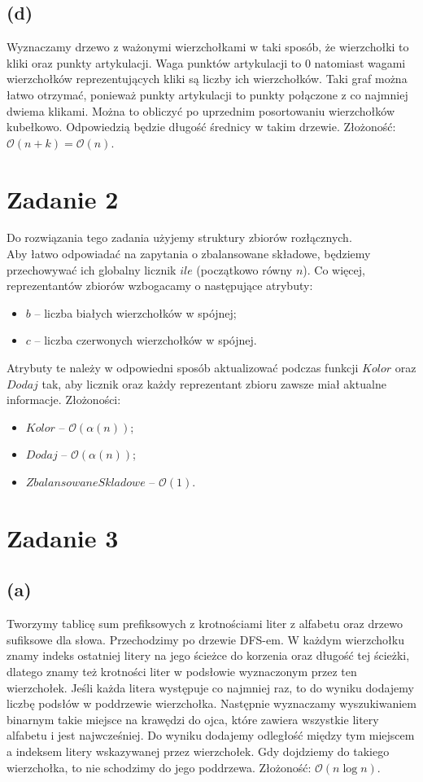 \documentclass[12pt, a4paper]{article}
\newcommand{\MCALO}{\mathcal{O}}
\begin{document}
\subsection*{(d)}
Wyznaczamy drzewo z ważonymi wierzchołkami w taki sposób, że wierzchołki to
kliki oraz punkty artykulacji. Waga punktów artykulacji to $0$ natomiast wagami
wierzchołków reprezentujących kliki są liczby ich wierzchołków. Taki graf można
łatwo otrzymać, ponieważ punkty artykulacji to punkty połączone z co najmniej
dwiema klikami. Można to obliczyć po uprzednim posortowaniu wierzchołków
kubełkowo. Odpowiedzią będzie długość średnicy w takim drzewie. 
Złożoność: $\MCALO(n+k) = \MCALO(n)$.

\newpage
\section*{Zadanie 2}
Do rozwiązania tego zadania użyjemy struktury zbiorów rozłącznych.\\
Aby łatwo odpowiadać na zapytania o zbalansowane składowe, będziemy
przechowywać ich globalny licznik $ile$ (początkowo równy $n$). Co więcej,
reprezentantów zbiorów wzbogacamy o następujące atrybuty:
\begin{itemize}
  \item $\mathit{b}$ -- liczba białych wierzchołków w spójnej;
  \item $\mathit{c}$ -- liczba czerwonych wierzchołków w spójnej.
\end{itemize}
Atrybuty te należy w odpowiedni sposób aktualizować podczas funkcji
$\mathit{Kolor}$ oraz $\mathit{Dodaj}$ tak, aby licznik oraz każdy reprezentant
zbioru zawsze miał aktualne informacje. Złożoności: 
\begin{itemize}
  \item $\mathit{Kolor}$ -- $\MCALO(\alpha(n))$;
  \item $\mathit{Dodaj}$ -- $\MCALO(\alpha(n))$;
  \item $\mathit{ZbalansowaneSkladowe}$ -- $\MCALO(1)$.
\end{itemize}

\section*{Zadanie 3}
\subsection*{(a)}
Tworzymy tablicę sum prefiksowych z krotnościami liter z alfabetu oraz drzewo
sufiksowe dla słowa. Przechodzimy po drzewie DFS-em. W każdym wierzchołku znamy
indeks ostatniej litery na jego ścieżce do korzenia oraz długość tej ścieżki,
dlatego znamy też krotności liter w podsłowie wyznaczonym przez ten
wierzchołek. Jeśli każda litera występuje co najmniej raz, to do wyniku
dodajemy liczbę podsłów w poddrzewie wierzchołka. Następnie wyznaczamy
wyszukiwaniem binarnym takie miejsce na krawędzi do ojca, które zawiera
wszystkie litery alfabetu i jest najwcześniej. Do wyniku dodajemy odległość
między tym miejscem a indeksem litery wskazywanej przez wierzchołek. Gdy
dojdziemy do takiego wierzchołka, to nie schodzimy do jego poddrzewa.
Złożoność: $\MCALO(n\log{n})$.
\end{document}
